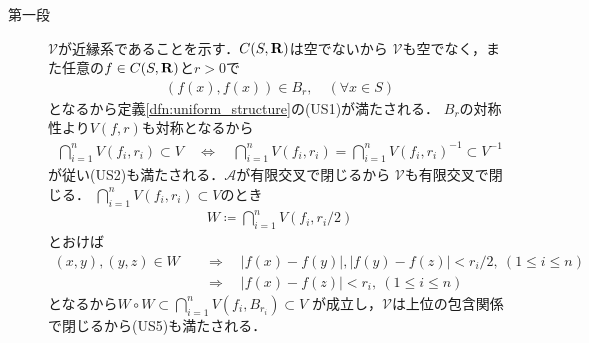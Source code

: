 	\begin{prf}\mbox{}
		\begin{description}
			\item[第一段] $\mathscr{V}$が近縁系であることを示す．$C(S,\mathbf{R})$は空でないから
				$\mathscr{V}$も空でなく，また任意の$f \in C(S,\mathbf{R})$と$r > 0$で
				\begin{align}
					(f(x),f(x)) \in B_r, \quad (\forall x \in S) 
				\end{align}
				となるから定義\ref{dfn:uniform_structure}の(US1)が満たされる．
				$B_r$の対称性より$V(f,r)$も対称となるから
				\begin{align}
					\bigcap_{i=1}^n V(f_i,r_i) \subset V
					\quad \Longleftrightarrow \quad
					\bigcap_{i=1}^n V(f_i,r_i) = \bigcap_{i=1}^n V(f_i,r_i)^{-1} \subset V^{-1}
				\end{align}
				が従い(US2)も満たされる．$\mathscr{A}$が有限交叉で閉じるから
				$\mathscr{V}$も有限交叉で閉じる．
				$\bigcap_{i=1}^n V(f_i,r_i) \subset V$のとき
				\begin{align}
					W \coloneqq \bigcap_{i=1}^n V(f_i,r_i/2)
				\end{align}
				とおけば
				\begin{align}
					(x,y),(y,z) \in W &\quad \Longrightarrow \quad
					|f(x) - f(y)|,|f(y)-f(z)| < r_i/2,\ (1 \leq i \leq n) \\
					&\quad \Longrightarrow \quad
					|f(x) - f(z)| < r_i,\ (1 \leq i \leq n)
				\end{align}
				となるから$W \circ W \subset \bigcap_{i=1}^n V(f_i,B_{r_i}) \subset V$
				が成立し，$\mathscr{V}$は上位の包含関係で閉じるから(US5)も満たされる．
				

\end{description}
\end{prf}
